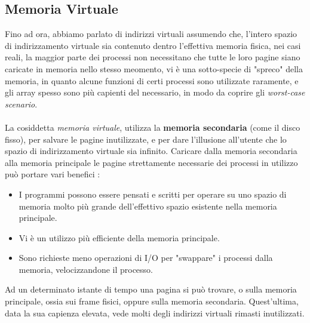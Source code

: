 \documentclass[12pt, letterpaper]{article}
\newcommand{\acc}{\\\hphantom{}\\}
\begin{document}
\subsection{Memoria Virtuale}
Fino ad ora, abbiamo parlato di indirizzi virtuali assumendo che, l'intero spazio di indirizzamento virtuale sia 
contenuto dentro l'effettiva memoria fisica, nei casi reali, la maggior parte dei processi non necessitano che tutte 
le loro pagine siano caricate in memoria nello stesso meomento, vi è una sotto-specie di "spreco" della memoria, in quanto 
alcune funzioni di certi processi sono utilizzate raramente, e gli array spesso sono più capienti del necessario, in modo 
da coprire gli \textit{worst-case scenario}.\acc  La cosiddetta \textit{memoria virtuale}, utilizza la \textbf{memoria 
secondaria} (come il disco fisso), per salvare le pagine inutilizzate, e per dare l'illusione all'utente che lo spazio 
di indirizzamento virtuale sia infinito. Caricare dalla memoria secondaria alla memoria principale le pagine 
strettamente necessarie dei processi in utilizzo può portare vari benefici : \begin{itemize}
    \item I programmi possono essere pensati e scritti per operare su uno spazio di memoria molto più grande 
    dell'effettivo spazio esistente nella memoria principale.
    \item Vi è un utilizzo più efficiente della memoria principale.
    \item Sono richieste meno operazioni di I/O per "swappare" i processi dalla memoria, velocizzandone il processo.
\end{itemize}
Ad un determinato istante di tempo una pagina si può trovare, o sulla memoria principale, ossia sui frame fisici, oppure 
sulla memoria secondaria. Quest'ultima, data la sua capienza elevata, vede molti degli indirizzi virtuali 
rimasti inutilizzati.
\end{document}
